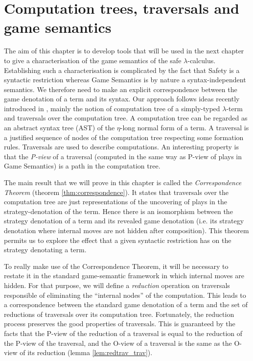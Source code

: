 \chapter{Computation trees, traversals and game semantics}

The aim of this chapter is to develop tools that will be used in the
next chapter to give a characterisation of the game semantics of the
safe $\lambda$-calculus. Establishing such a characterisation is
complicated by the fact that Safety is a syntactic restriction
whereas Game Semantics is by nature a syntax-independent semantics.
We therefore need to make an explicit correspondence between the
game denotation of a term and its syntax. Our approach follows ideas
recently introduced in \cite{OngLics2006}, mainly the notion of
computation tree of a simply-typed $\lambda$-term and traversals
over the computation tree. A computation tree can be regarded as an
abstract syntax tree (AST) of the $\eta$-long normal form of a term.
A traversal is a justified sequence of nodes of the computation tree
respecting some formation rules. Traversals are used to describe
computations. An interesting property is that the \emph{P-view} of a
traversal (computed in the same way as P-view of plays in Game
Semantics) is a path in the computation tree.

The main result that we will prove in this chapter is called the
\emph{Correspondence Theorem} (theorem \ref{thm:correspondence}). It
states that traversals over the computation tree are just
representations of the uncovering of plays in the
strategy-denotation of the term. Hence there is an isomorphism
between the strategy denotation of a term and its revealed game
denotation (i.e. its strategy denotation where internal moves are
not hidden after composition). This theorem permits us to explore
the effect that a given syntactic restriction has on the strategy
denotating a term.

To really make use of the Correspondence Theorem, it will be
necessary to restate it in the standard game-semantic framework in
which internal moves are hidden. For that purpose, we will define a
\emph{reduction} operation on traversals responsible of eliminating
the ``internal nodes'' of the computation. This leads to a
correspondence between the standard game denotation of a term and
the set of reductions of traversals over its computation tree.
Fortunately, the reduction process preserves the good properties of
traversals. This is guaranteed by the facts that the P-view of the
reduction of a traversal is equal to the reduction of the P-view of
the traversal, and the O-view of a traversal is the same as the
O-view of its reduction (lemma \ref{lem:redtrav_trav}). \vspace{8pt}

